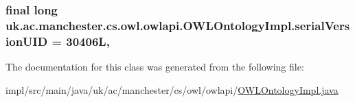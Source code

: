 \hypertarget{classuk_1_1ac_1_1manchester_1_1cs_1_1owl_1_1owlapi_1_1_o_w_l_ontology_impl_aa0524f237baa931122fe5d49ec04935d}{
\subsubsection[{serial\-Version\-U\-I\-D}]{\setlength{\rightskip}{0pt plus 5cm}final long uk.\-ac.\-manchester.\-cs.\-owl.\-owlapi.\-O\-W\-L\-Ontology\-Impl.\-serial\-Version\-U\-I\-D = 30406\-L\hspace{0.3cm}{\ttfamily [static]}, {\ttfamily [private]}}}\label{classuk_1_1ac_1_1manchester_1_1cs_1_1owl_1_1owlapi_1_1_o_w_l_ontology_impl_aa0524f237baa931122fe5d49ec04935d}


The documentation for this class was generated from the following file\-:\begin{DoxyCompactItemize}
\item 
impl/src/main/java/uk/ac/manchester/cs/owl/owlapi/\hyperlink{_o_w_l_ontology_impl_8java}{O\-W\-L\-Ontology\-Impl.\-java}\end{DoxyCompactItemize}
